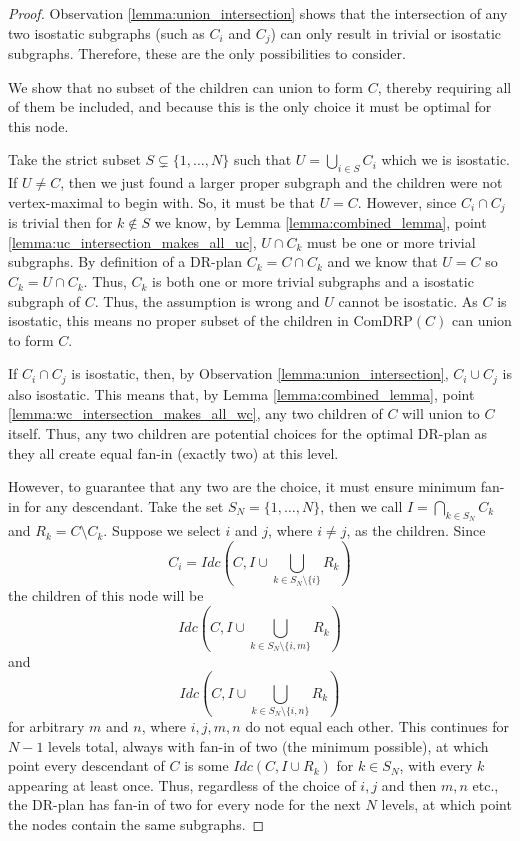 \begin{proof}
Observation \ref{lemma:union_intersection} shows that the intersection of any two isostatic subgraphs (such as $C_i$ and $C_j$) can only result in trivial or isostatic subgraphs. Therefore, these are the only possibilities to consider.

\medskip\noindent
{} We show that no subset of the children can union to form $C$, thereby requiring all of them be included, and because this is the only choice it must be optimal for this node.

Take the strict subset $S\subsetneq \{1,\ldots,N\}$ such that $U=\bigcup_{i\in S}{C_i}$ which we  is isostatic. If $U\neq C$, then we just found a larger proper subgraph and the children were not vertex-maximal to begin with. So, it must be that $U=C$.
\usestwod
However, since $C_i \cap C_j$ is trivial then for $k\notin S$ we know, by Lemma \ref{lemma:combined_lemma}, point \ref{lemma:uc_intersection_makes_all_uc}, $U\cap C_k$ must be one or more trivial subgraphs. By definition of a DR-plan $C_k=C\cap C_k$ and we know that $U=C$ so $C_k=U\cap C_k$. Thus, $C_k$ is both one or more trivial subgraphs and a isostatic subgraph of $C$. Thus, the assumption is wrong and $U$ cannot be isostatic. As $C$ is isostatic, this means no proper subset of the children in ComDRP$(C)$ can union to form $C$.

\medskip\noindent
{} If $C_i \cap C_j$ is isostatic, then, by Observation \ref{lemma:union_intersection}, $C_i \cup C_j$ is also isostatic. This means that, by Lemma \ref{lemma:combined_lemma}, point \ref{lemma:wc_intersection_makes_all_wc}, any two children of $C$ will union to $C$ itself. Thus, any two children are potential choices for the optimal DR-plan as they all create equal fan-in (exactly two) at this level.

However, to guarantee that any two are the  choice, it must ensure minimum fan-in for any descendant. Take the set $S_N=\{1,\dots,N\}$, then we call $I=\bigcap_{k\in S_N}{C_k}$ and $R_k=C\setminus C_k$. Suppose we select $i$ and $j$, where $i\neq j$, as the children. Since
\[C_i=Idc\left(C,I\cup\bigcup_{k\in S_N\setminus\{i\}}{R_k}\right)\]
the children of this node will be
\[Idc\left(C,I\cup\bigcup_{k\in S_N\setminus\{i,m\}}{R_k}\right)\]
and
\[Idc\left(C,I\cup\bigcup_{k\in S_N\setminus\{i,n\}}{R_k}\right)\]
for arbitrary $m$ and $n$, where $i,j,m,n$ do not equal each other.  This continues for $N-1$ levels total, always with fan-in of two (the minimum possible), at which point every descendant of $C$ is some $Idc(C,I\cup R_k)$ for $k\in S_N$, with every $k$ appearing at least once. Thus, regardless of the choice of $i,j$ and then $m,n$ etc., the DR-plan has fan-in of two for every node for the next $N$ levels, at which point the nodes contain the same subgraphs.


\end{proof}
